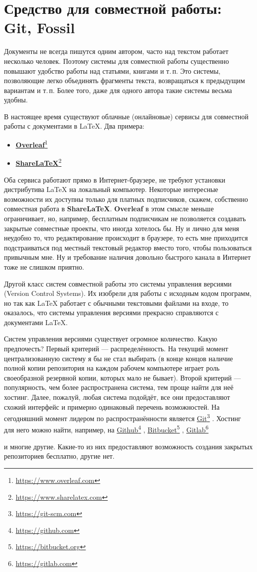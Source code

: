 \documentclass[a4paper,12pt]{article}
\newcommand\foothref[2]{%
  \href{#1}{#2}\footnote{\url{#1}}%
}
\begin{document}
\section{Средство для совместной работы: Git, Fossil}
Документы не всегда пишутся одним автором, часто над текстом работает несколько
человек. Поэтому системы для совместной работы существенно повышают удобство работы
над статьями, книгами и т.\,п. Это системы, позволяющие легко объединять фрагменты
текста, возвращаться к предыдущим вариантам и т.\,п. Более того, даже для одного автора
такие системы весьма удобны.

В настоящее время существуют облачные (онлайновые) сервисы для совместной работы с
документами в \LaTeX{}. Два примера:
\begin{itemize}
  \item \foothref{https://www.overleaf.com}{\textbf{Overleaf}}
  \item \foothref{https://www.sharelatex.com}{\textbf{ShareLaTeX}}
\end{itemize}
Оба сервиса работают прямо в Интернет-браузере, не требуют установки дистрибутива
\LaTeX{} на локальный компьютер. Некоторые интересные возможности их доступны только
для платных подписчиков, скажем, собственно совместная работа в \textbf{ShareLaTeX}.
\textbf{Overleaf} в этом смысле меньше ограничивает, но, например, бесплатным
подписчикам не позволяется создавать закрытые совместные проекты, что иногда
хотелось бы. Ну и лично для меня неудобно то, что редактирование происходит в
браузере, то есть мне приходится подстраиваться под местный текстовый редактор
вместо того, чтобы пользоваться привычным мне. Ну и требование наличия довольно
быстрого канала в Интернет тоже не слишком приятно.

Другой класс систем совместной работы это системы управления версиями (Version
Control Systems). Их изобрели для работы с исходным кодом программ, но так как
\LaTeX{} работает с обычными текстовыми файлами на входе, то оказалось, что
системы управления версиями прекрасно справляются с документами \LaTeX{}.

Систем управления версиями существует огромное количество. Какую предпочесть?
Первый критерий --- распределённость. На текущий момент централизованную систему
я бы не стал выбирать (в конце концов наличие полной копии репозитория на каждом
рабочем компьютере играет роль своеобразной резервной копии, которых мало не
бывает). Второй критерий --- популярность, чем более распространена система, тем проще
найти для неё хостинг. Далее, пожалуй, любая система подойдёт, все они предоставляют
схожий интерфейс и примерно одинаковый перечень возможностей. На сегодняшний момент
лидером по распространённости является \foothref{https://git-scm.com}{Git}.
Хостинг для него можно найти, например, на \foothref{https://github.com}{Github},
\foothref{https://bitbucket.org}{Bitbucket}, \foothref{https://gitlab.com}{Gitlab}
и многие другие. Какие-то из них предоставляют возможность создания закрытых
репозиториев бесплатно, другие нет.
\end{document}

